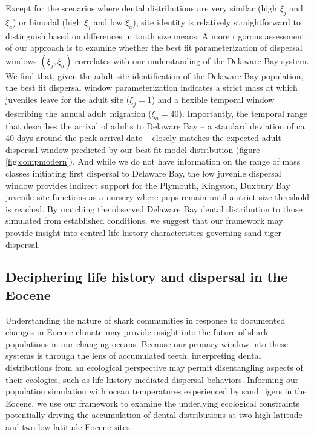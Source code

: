 \documentclass[]{rsos}%
\begin{document}
Except for the scenarios where dental distributions are very similar (high $\xi_j$ and $\xi_a$) or bimodal (high $\xi_j$ and low $\xi_a$), site identity is relatively straightforward to distinguish based on differences in tooth size means.
A more rigorous assessment of our approach is to examine whether the best fit parameterization of dispersal windows $(\xi_j,\xi_a)$ correlates with our understanding of the Delaware Bay system.
We find that, given the adult site identification of the Delaware Bay population, the best fit dispersal window parameterization indicates a strict mass at which juveniles leave for the adult site ($\xi_j = 1$) and a flexible temporal window describing the annual adult migration ($\xi_a = 40$).
Importantly, the temporal range that describes the arrival of adults to Delaware Bay -- a standard deviation of ca. 40 days around the peak arrival date \cite{haulsee2018spatial}  -- closely matches the expected adult dispersal window predicted by our best-fit model distribution (figure \ref{fig:compmodern}).
And while we do not have information on the range of mass classes initiating first dispersal to Delaware Bay, the low juvenile dispersal window provides indirect support for the Plymouth, Kingston, Duxbury Bay juvenile site functions as a nursery where pups remain until a strict size threshold is reached. 
By matching the observed Delaware Bay dental distribution to those simulated from established conditions, we suggest that our framework may provide insight into central life history characteristics governing sand tiger dispersal.



\subsection{Deciphering life history and dispersal in the Eocene}

Understanding the nature of shark communities in response to documented changes in Eocene climate may provide insight into the future of shark populations in our changing oceans.
Because our primary window into these systems is through the lens of accumulated teeth, interpreting dental distributions from an ecological perspective may permit disentangling aspects of their ecologies, such as life history mediated dispersal behaviors.
Informing our population simulation with ocean temperatures experienced by sand tigers in the Eocene, we use our framework to examine the underlying ecological constraints potentially driving the accumulation of dental distributions at two high latitude and two low latitude Eocene sites.
\end{document}
